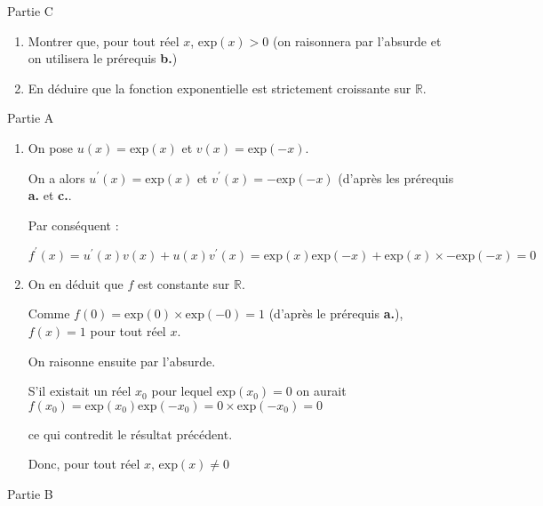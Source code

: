 \begin{h3}Partie C \end{h3}
\begin{enumerate}
     \item
     Montrer que, pour tout réel $x$,  $\text{exp}\left(x\right) > 0$ (on raisonnera par l'absurde et on utilisera le prérequis \textbf{b.})
     \item
     En déduire que la fonction exponentielle est strictement croissante sur $\mathbb{R}$.
\end{enumerate}
\begin{corrige}
     \begin{h3}Partie A\end{h3}
     \begin{enumerate}
          \item
          On pose $u\left(x\right)=\text{exp}\left(x\right)$ et $v\left(x\right)=\text{exp}\left(-x\right)$.
          \par
          On a alors $u^{\prime}\left(x\right)=\text{exp}\left(x\right)$ et $v^{\prime}\left(x\right)=-\text{exp}\left(-x\right)$ (d'après les prérequis \textbf{a.} et \textbf{c.}.
          \par
          Par conséquent :
          \par
          $f^{\prime}\left(x\right)=u^{\prime}\left(x\right)v\left(x\right)+u\left(x\right)v^{\prime}\left(x\right)=\text{exp}\left(x\right)\text{exp}\left(-x\right)+\text{exp}\left(x\right)\times -\text{exp}\left(-x\right)=0$
          \item
          On en déduit que $f$ est constante sur $\mathbb{R}$.
          \par
          Comme $f\left(0\right)=\text{exp}\left(0\right)\times \text{exp}\left(-0\right)=1$ (d'après le prérequis \textbf{a.}), $f\left(x\right)=1$ pour tout réel $x$.
          \par
          On raisonne ensuite par l'absurde.
          \par
          S'il existait un réel $x_{0}$ pour lequel  $\text{exp}\left(x_{0}\right)=0$ on aurait $f\left(x_{0}\right)=\text{exp}\left(x_{0}\right)\text{exp}\left(-x_{0}\right)=0\times \text{exp}\left(-x_{0}\right)=0$
          \par
          ce qui contredit le résultat précédent.
          \par
          Donc, pour tout réel $x$, $\text{exp}\left(x\right)\neq 0$
     \end{enumerate}
     \begin{h3}Partie B\end{h3}

\end{corrige}
